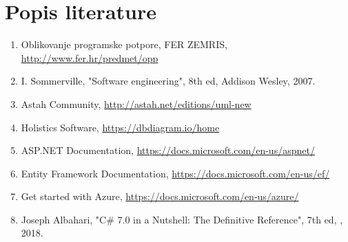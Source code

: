 \chapter*{Popis literature}
	 	

		\begin{enumerate}
			
			
			\item  Oblikovanje programske potpore, FER ZEMRIS, \url{http://www.fer.hr/predmet/opp}
			
			\item  I. Sommerville, "Software engineering", 8th ed, Addison Wesley, 2007.
			
			
			\item  Astah Community, \url{http://astah.net/editions/uml-new}
			
			\item Holistics Software, \url{https://dbdiagram.io/home}
			
			\item ASP.NET Documentation,
			\url{https://docs.microsoft.com/en-us/aspnet/}
			
			\item Entity Framework Documentation,
			\url{https://docs.microsoft.com/en-us/ef/}
			
			\item Get started with Azure,
			\url{https://docs.microsoft.com/en-us/azure/}
			
			\item  Joseph Albahari, "C# 7.0 in a Nutshell: The Definitive Reference", 7th ed, , 2018.
			
			
		\end{enumerate}
		
		 